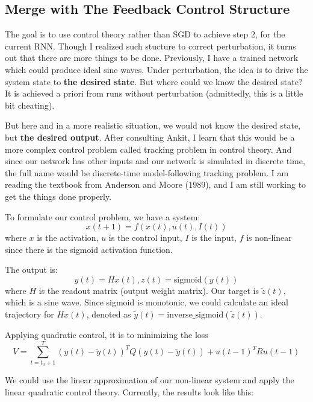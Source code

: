 \documentclass[12pt, a4paper]{article}
\begin{document}
\newpage

\subsection*{Merge with The Feedback Control Structure}

The goal is to use control theory rather than SGD to achieve step 2, for the current RNN. Though I realized such stucture to correct perturbation, it turns out that there are more things to be done. Previously, I have a trained network which could produce ideal sine waves. Under perturbation, the idea is to drive the system state to \textbf{the desired state}. But where could we know the desired state? It is achieved a priori from runs without perturbation (admittedly, this is a little bit cheating). 

But here and in a more realistic situation, we would not know the desired state, but \textbf{the desired output}. After consulting Ankit, I learn that this would be a more complex control problem called tracking problem in control theory. And since our network has other inputs and our network is simulated in discrete time, the full name would be discrete-time model-following tracking problem. I am reading the textbook from Anderson and Moore (1989), and I am still working to get the things done properly. 

To formulate our control problem, we have a system: 
$$x(t+1) = f(x(t), u(t), I(t))$$
where $x$ is the activation, $u$ is the control input, $I$ is the input, $f$ is non-linear since there is the sigmoid activation function.

The output is:
$$y(t) = Hx(t), z(t) = \text{sigmoid}(y(t))$$
where $H$ is the readout matrix (output weight matrix). Our target is $\tilde{z}(t)$, which is a sine wave. Since sigmoid is monotonic, we could calculate an ideal trajectory for $Hx(t)$, denoted as $\tilde{y}(t) = \text{inverse\_sigmoid}(\tilde{z}(t))$.

Applying quadratic control, it is to minimizing the loss $$V = \sum_{t=t_0+1}^T (y(t) - \tilde{y}(t))^T Q (y(t)- \tilde{y}(t)) + u(t-1)^T R u(t-1)$$

We could use the linear approximation of our non-linear system and apply the linear quadratic control theory. Currently, the results look like this:
\end{document}
